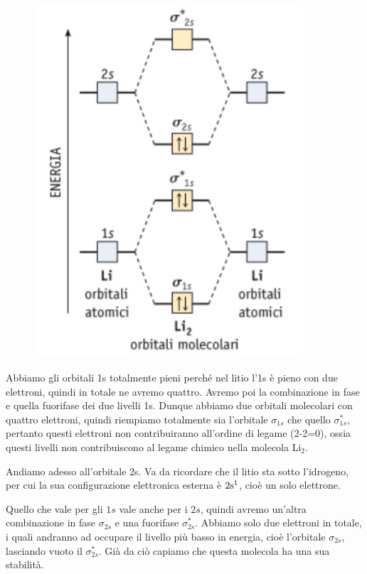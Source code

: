 \begin{figure}[H]
    \centering
    \includegraphics[width=10cm]{immagini/orbitali_molecolari_Li_2.png}
\end{figure}

Abbiamo gli orbitali 1s totalmente pieni perché nel litio l'1s è pieno con due elettroni, quindi in totale ne avremo quattro. Avremo poi la combinazione in fase e quella fuorifase dei due livelli 1s. Dunque abbiamo due orbitali molecolari con quattro elettroni, quindi riempiamo totalmente sia l'orbitale $\sigma_{1s}$ che quello $\sigma^*_{1s}$, pertanto questi elettroni non contribuiranno all'ordine di legame (2-2=0), ossia questi livelli non contribuiscono al legame chimico nella molecola Li$_2$.

\vspace{0.2cm}Andiamo adesso all'orbitale 2s. Va da ricordare che il litio sta sotto l'idrogeno, per cui la sua configurazione elettronica esterna è $\rm 2s^1$, cioè un solo elettrone.
    
Quello che vale per gli $1s$ vale anche per i $2s$, quindi avremo un'altra combinazione in fase $\sigma_{2s}$ e una fuorifase $\sigma_{2s}^*$. Abbiamo solo due elettroni in totale, i quali andranno ad occupare il livello più basso in energia, cioè l'orbitale $\sigma_{2s}$, lasciando vuoto il $\sigma_{2s}^*$. Già da ciò capiamo che questa molecola ha una sua stabilità.

